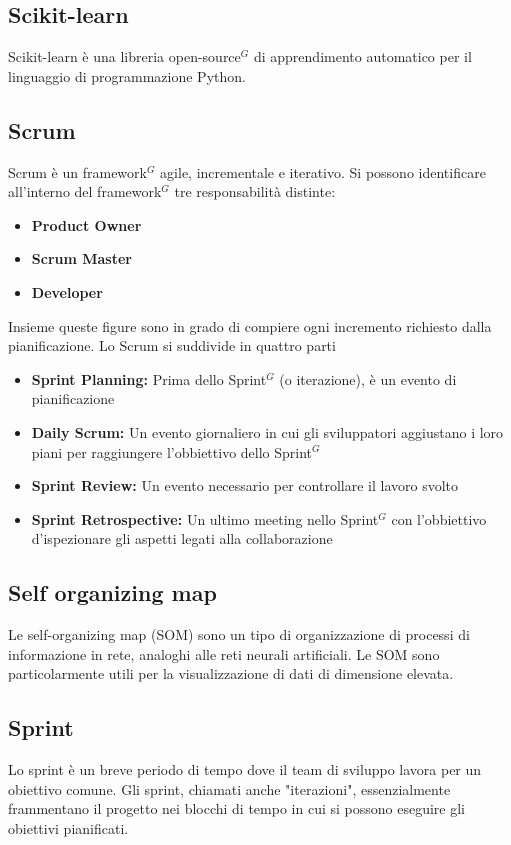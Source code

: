\subsection{Scikit-learn}
Scikit-learn è una libreria open-source$^{G}$ di apprendimento automatico per il linguaggio di programmazione Python.

\subsection{Scrum}
Scrum è un framework$^{G}$ agile, incrementale e iterativo.\newline
Si possono identificare all'interno del framework$^{G}$ tre responsabilità distinte:
\begin{itemize}
    \item \textbf{Product Owner}
    \item \textbf{Scrum Master}
    \item \textbf{Developer}
\end{itemize}
Insieme queste figure sono in grado di compiere ogni incremento richiesto dalla pianificazione.
\newline
Lo Scrum si suddivide in quattro parti
\begin{itemize}
    \item \textbf{Sprint Planning:} Prima dello Sprint$^{G}$ (o iterazione), è un evento di pianificazione
    \item \textbf{Daily Scrum:} Un evento giornaliero in cui gli sviluppatori aggiustano i loro piani per raggiungere l'obbiettivo dello Sprint$^{G}$
    \item \textbf{Sprint Review:} Un evento necessario per controllare il lavoro svolto
    \item \textbf{Sprint Retrospective:} Un ultimo meeting nello Sprint$^{G}$ con l'obbiettivo d'ispezionare gli aspetti legati alla collaborazione
\end{itemize}

\subsection{Self organizing map}
Le self-organizing map (SOM) sono un tipo di organizzazione di processi di informazione in rete, analoghi alle reti neurali artificiali. Le SOM sono particolarmente utili per la visualizzazione di dati di dimensione elevata.

\subsection{Sprint}
Lo sprint è un breve periodo di tempo dove il team di sviluppo lavora per un obiettivo comune. Gli sprint, chiamati anche
"iterazioni", essenzialmente frammentano il progetto nei blocchi di tempo in cui si possono eseguire gli obiettivi pianificati.

